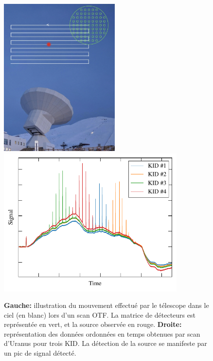 \begin{figure}[t]
    \centering
    \includegraphics[height=8cm]{Figures/Chap_nk/otf_telescope_source.jpg}\hspace{10pt}
    \includegraphics[height=7.5cm]{Figures/Chap_nk/tois.pdf}
    \caption{
        \textbf{Gauche:} illustration du mouvement effectué par le télescope dans le ciel (en blanc) lors d'un scan OTF.
        La matrice de détecteurs est représentée en vert, et la source observée en rouge.
        \textbf{Droite:} représentation des données ordonnées en temps obtenues par scan d'Uranus pour trois KID.
        La détection de la source se manifeste par un pic de signal détecté.
    }
    \label{fig:nk_otf_toi}
\end{figure}

